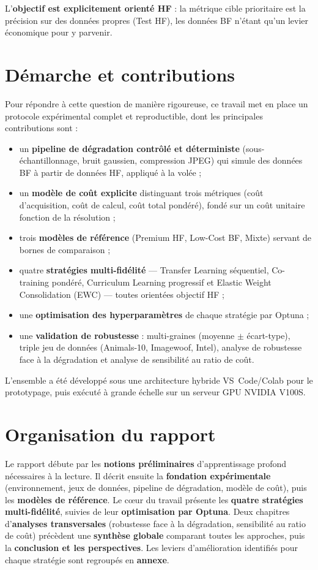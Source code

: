 \documentclass[11pt,a4paper,openany]{book}
\begin{document}
L'\textbf{objectif est explicitement orienté HF} : la métrique cible prioritaire est la précision sur des données propres (Test HF), les données BF n'étant qu'un levier économique pour y parvenir.

\section{Démarche et contributions}

Pour répondre à cette question de manière rigoureuse, ce travail met en place un protocole expérimental complet et reproductible, dont les principales contributions sont :

\begin{itemize}
  \item un \textbf{pipeline de dégradation contrôlé et déterministe} (sous-échantillonnage, bruit gaussien, compression JPEG) qui simule des données BF à partir de données HF, appliqué à la volée ;
  \item un \textbf{modèle de coût explicite} distinguant trois métriques (coût d'acquisition, coût de calcul, coût total pondéré), fondé sur un coût unitaire fonction de la résolution ;
  \item trois \textbf{modèles de référence} (Premium HF, Low-Cost BF, Mixte) servant de bornes de comparaison ;
  \item quatre \textbf{stratégies multi-fidélité} — Transfer Learning séquentiel, Co-training pondéré, Curriculum Learning progressif et Elastic Weight Consolidation (EWC) — toutes orientées objectif HF ;
  \item une \textbf{optimisation des hyperparamètres} de chaque stratégie par Optuna ;
  \item une \textbf{validation de robustesse} : multi-graines (moyenne $\pm$ écart-type), triple jeu de données (Animals-10, Imagewoof, Intel), analyse de robustesse face à la dégradation et analyse de sensibilité au ratio de coût.
\end{itemize}

L'ensemble a été développé sous une architecture hybride VS~Code/Colab pour le prototypage, puis exécuté à grande échelle sur un serveur GPU NVIDIA V100S.

\section{Organisation du rapport}

Le rapport débute par les \textbf{notions préliminaires} d'apprentissage profond nécessaires à la lecture. Il décrit ensuite la \textbf{fondation expérimentale} (environnement, jeux de données, pipeline de dégradation, modèle de coût), puis les \textbf{modèles de référence}. Le cœur du travail présente les \textbf{quatre stratégies multi-fidélité}, suivies de leur \textbf{optimisation par Optuna}. Deux chapitres d'\textbf{analyses transversales} (robustesse face à la dégradation, sensibilité au ratio de coût) précèdent une \textbf{synthèse globale} comparant toutes les approches, puis la \textbf{conclusion et les perspectives}. Les leviers d'amélioration identifiés pour chaque stratégie sont regroupés en \textbf{annexe}.
\end{document}
